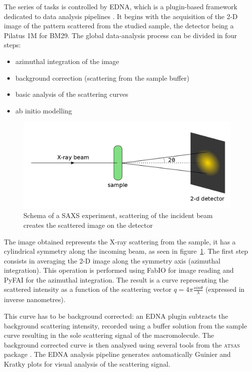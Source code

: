 \documentclass[a4paper, 11pt]{report}
\begin{document}
The series of tasks is controlled by EDNA, which is a plugin-based 
framework dedicated to data analysis pipelines \cite{edna}. 
It begins with the acquisition of the 2-D image of the pattern 
scattered from the studied sample, the detector being a Pilatus 1M for 
BM29. 
The global data-analysis process can be divided in four steps: 
\begin{itemize}
 \item azimuthal integration of the image
 \item background correction (scattering from the sample buffer)
 \item basic analysis of the scattering curves
 \item ab initio modelling
\end{itemize}

\begin{figure}
\centering
\includegraphics[scale=0.3]{schemaSAXS.png}
\caption{Schema of a SAXS experiment, scattering of the incident beam 
    creates the scattered image on the detector}
\label{fgr:schemaSAXS}
\end{figure}

The image obtained represents the X-ray scattering from the sample, it 
has a cylindrical symmetry along the incoming beam, as seen in 
figure~\ref{fgr:schemaSAXS}. 
The first step consists in averaging the 2-D image along the 
symmetry axis (azimuthal integration).  
This operation is performed using FabIO \cite{fabio} for image reading 
and PyFAI \cite{pyFAI} for the azimuthal integration. 
The result is a curve representing the scattered intensity as a 
function of the scattering vector $q = 4 \pi \frac{sin\theta}{\lambda}$ 
(expressed in inverse nanometres).

This curve has to be background corrected: an EDNA plugin subtracts the
background scattering intensity, recorded using a buffer
solution from the sample curve resulting in the sole scattering signal 
of the macromolecule. 
The background corrected curve is then analysed using several tools 
from the \textsc{atsas} package \cite{atsas}. 
The EDNA analysis pipeline generates automatically Guinier and Kratky
plots for visual analysis of the scattering signal.\\
\end{document}
